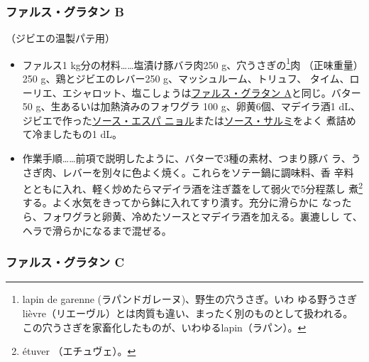 \begin{recette}
\hypertarget{farce-gratin-b}{%
\subsubsection{ファルス・グラタン B}\label{farce-gratin-b}}


（ジビエの温製パテ用）


\begin{itemize}
\item
  ファルス1 kg分の材料\ldots{}\ldots{}塩漬け豚バラ肉250
  g、穴うさぎの\footnote{lapin de garenne
    (ラパンドガレーヌ)、野生の穴うさぎ。いわ
    ゆる野うさぎlièvre（リエーヴル）とは肉質も違い、まったく別のものとして扱われる。
    この穴うさぎを家畜化したものが、いわゆるlapin（ラパン）。}肉
  （正味重量）250 g、鶏とジビエのレバー250 g、マッシュルーム、トリュフ、
  タイム、ローリエ、エシャロット、塩こしょうは\protect\hyperlink{farce-gratin-a}{ファルス・グラタン
  A}と同じ。バター50 g、生あるいは加熱済みのフォワグラ 100
  g、卵黄6個、マデイラ酒1\undemi{}
  dL、ジビエで作った\protect\hyperlink{sauce-espagnole}{ソース・エスパ
  ニョル}または\protect\hyperlink{sauce-salmis}{ソース・サルミ}をよく
  煮詰めて冷ましたもの1\undemi{} dL。
\item
  作業手順\ldots{}\ldots{}前項で説明したように、バターで3種の素材、つまり豚バ
  ラ、うさぎ肉、レバーを別々に色よく焼く。これらをソテー鍋に調味料、香
  辛料とともに入れ、軽く炒めたらマデイラ酒を注ぎ蓋をして弱火で5分程蒸し
  煮\footnote{étuver （エチュヴェ）。}する。よく水気をきってから鉢に入れてすり潰す。充分に滑らかに
  なったら、フォワグラと卵黄、冷めたソースとマデイラ酒を加える。裏漉しし
  て、ヘラで滑らかになるまで混ぜる。
\end{itemize}

\hypertarget{farce-gratin-c}{%
\subsubsection{ファルス・グラタン C}\label{farce-gratin-c}}




\end{recette}
